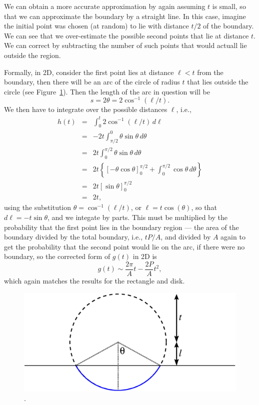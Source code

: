 \documentclass{article}
\begin{document}
We can obtain a more accurate approximation by again assuming $t$ is
small, so that we can approximate the boundary by a straight line. In
this case, imagine the initial point was chosen (at random) to lie
with distance $t/2$ of the boundary. We can see that we over-estimate
the possible second points that lie at distance $t$. We can correct by
subtracting the number of such points that would actuall lie outside
the region.

Formally, in 2D, consider the first point lies at distance $\ell<t$
from the boundary, then there will be an arc of the circle of radius
$t$ that lies outside the circle (see
Figure~\ref{fig:perimeter}). Then the length of the arc in question
will be
\begin{equation}
  \label{eq:arc_len}
  s = 2 \theta = 2 \cos^{-1} (\ell / t).
\end{equation}
We then have to integrate over the possible distances $\ell$, i.e., 
\begin{eqnarray}
  \label{eq:correction_2nd_order}
   h(t) & = & \int_0^t 2 \cos^{-1} (\ell / t)  \, d\ell \nonumber \\
        & = &  - 2 t \int_{\pi/2}^0 \theta  \sin \theta \, d\theta  \nonumber \\
        & = &  2 t \int^{\pi/2}_0 \theta  \sin \theta \, d\theta  \nonumber \\
        & = &  2 t \left\{ \left[ -\theta  \cos \theta \right]^{\pi/2}_0 + 
                      \int^{\pi/2}_0  \cos \theta \, d\theta
                   \right\}  \nonumber \\
        & = &  2 t \left[ \sin \theta \right]^{\pi/2}_0  \nonumber \\
        & = &  2 t,
\end{eqnarray}
using the substitution $\theta = \cos^{-1} (\ell / t)$, or $\ell = t
\cos(\theta)$, so that $d \ell = - t \sin \theta$, and we integate by
parts. This must be multiplied by the probability that the first point
lies in the boundary region --- the area of the boundary divided by the
total boundary, i.e., $t P/A$, and divided by $A$ again to get the
probability that the second point would lie on the arc, if there were
no boundary, so the corrected form of $g(t)$ in 2D is
\begin{equation}
  g(t) \sim  \frac{2 \pi}{A} t - \frac{2 P}{A} t^2,
\end{equation}
which again matches the results for the rectangle and disk.

\begin{figure}[tbp]
  \begin{center}
    \includegraphics[width=0.33\columnwidth]{Figs/perimeter.eps}
    \caption{.}
    \label{fig:perimeter}
  \end{center} 
\vspace{-4mm}
\end{figure}
\end{document}
